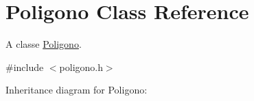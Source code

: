 \hypertarget{classPoligono}{}\section{Poligono Class Reference}
\label{classPoligono}


A classe \hyperlink{classPoligono}{Poligono}.  




{\ttfamily \#include $<$poligono.\+h$>$}



Inheritance diagram for Poligono\+:
